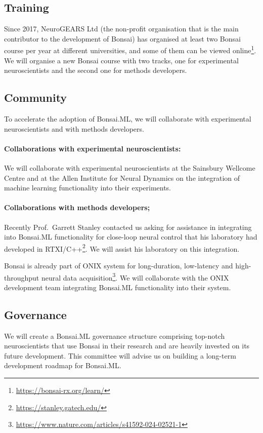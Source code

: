 \subsection*{Training}

Since 2017, NeuroGEARS Ltd (the non-profit organisation that is the main
contributor to the development of Bonsai) has organised at least two Bonsai
course per year at different universities, and some of them can be viewed
online\footnote[5]{\url{https://bonsai-rx.org/learn/}}. We will organise a new
Bonsai course with two tracks, one for experimental neuroscientists and the
second one for methods developers.

\subsection*{Community}

To accelerate the adoption of Bonsai.ML, we will collaborate with experimental
neuroscientists and with methods developers.

\paragraph{Collaborations with experimental neuroscientists:} We will
collaborate with experimental neuroscientists at the Sainsbury Wellcome Centre
and at the Allen Institute for Neural Dynamics on the integration of machine
learning functionality into their experiments.

\paragraph{Collaborations with methods developers;} Recently Prof.~Garrett
Stanley contacted us asking for assistance in integrating into Bonsai.ML
functionality for close-loop neural control that his laboratory had developed
in RTXI/C++\footnote[6]{\url{https://stanley.gatech.edu/}}. We will assist his
laboratory on this integration.

Bonsai is already part of ONIX system for long-duration, low-latency and
high-throughput neural data
acquisition\footnote[7]{\url{https://www.nature.com/articles/s41592-024-02521-1}}.  We
will collaborate with the ONIX development team integrating Bonsai.ML
functionality into their system.

\subsection*{Governance}

We will create a Bonsai.ML governance structure comprising top-notch
neuroscientists that use Bonsai in their research and are heavily invested on
its future development.
%
This committee will advise us on building a long-term development roadmap for
Bonsai.ML.
